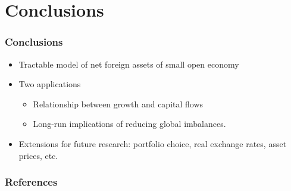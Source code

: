\documentclass{beamer}
\begin{document}
\section{Conclusions}

\begin{frame}
\frametitle{Conclusions}
    \begin{itemize}
    \item Tractable model of net foreign assets of small open economy
    \item Two applications
        \begin{itemize}
        \item Relationship between growth and capital flows
        \item Long-run implications of reducing global imbalances.
        \end{itemize}
    \item Extensions for future research: portfolio choice, real exchange rates, asset prices, etc.
    \end{itemize}

\end{frame}

\tiny 
\beamerdefaultoverlayspecification{<*>}

\begin{frame}[allowframebreaks]
\frametitle{\textbf{References}}
\tiny

\end{frame}
\end{document}
